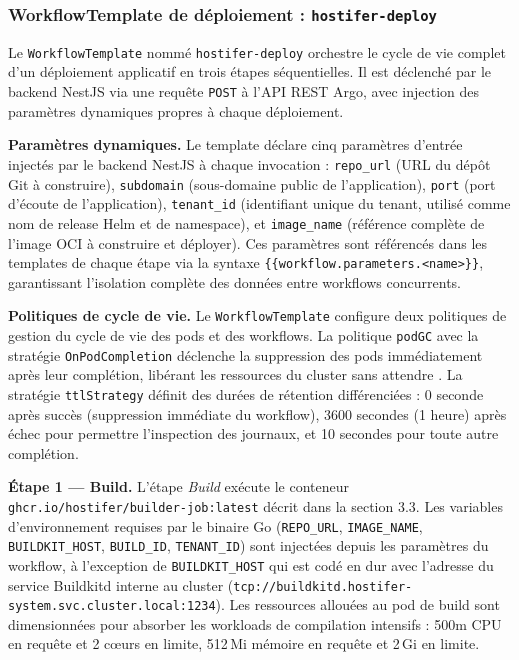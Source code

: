 \subsubsection*{WorkflowTemplate de déploiement : \texttt{hostifer-deploy}}

Le \texttt{WorkflowTemplate} nommé \texttt{hostifer-deploy} orchestre le cycle de vie complet d'un déploiement applicatif en trois étapes séquentielles. Il est déclenché par le backend NestJS via une requête \texttt{POST} à l'API REST Argo, avec injection des paramètres dynamiques propres à chaque déploiement.

\textbf{Paramètres dynamiques.} Le template déclare cinq paramètres d'entrée injectés par le backend NestJS à chaque invocation : \texttt{repo\_url} (URL du dépôt Git à construire), \texttt{subdomain} (sous-domaine public de l'application), \texttt{port} (port d'écoute de l'application), \texttt{tenant\_id} (identifiant unique du tenant, utilisé comme nom de release Helm et de namespace), et \texttt{image\_name} (référence complète de l'image OCI à construire et déployer). Ces paramètres sont référencés dans les templates de chaque étape via la syntaxe \texttt{\{\{workflow.parameters.<name>\}\}}, garantissant l'isolation complète des données entre workflows concurrents.

\textbf{Politiques de cycle de vie.} Le \texttt{WorkflowTemplate} configure deux politiques de gestion du cycle de vie des pods et des workflows. La politique \texttt{podGC} avec la stratégie \texttt{OnPodCompletion} déclenche la suppression des pods immédiatement après leur complétion, libérant les ressources du cluster sans attendre \cite{argo-pod-gc}. La stratégie \texttt{ttlStrategy} définit des durées de rétention différenciées : 0 seconde après succès (suppression immédiate du workflow), 3600 secondes (1 heure) après échec pour permettre l'inspection des journaux, et 10 secondes pour toute autre complétion.

\textbf{Étape 1 — Build.} L'étape \textit{Build} exécute le conteneur \texttt{ghcr.io/hostifer/builder-job:latest} décrit dans la section 3.3. Les variables d'environnement requises par le binaire Go (\texttt{REPO\_URL}, \texttt{IMAGE\_NAME}, \texttt{BUILDKIT\_HOST}, \texttt{BUILD\_ID}, \texttt{TENANT\_ID}) sont injectées depuis les paramètres du workflow, à l'exception de \texttt{BUILDKIT\_HOST} qui est codé en dur avec l'adresse du service Buildkitd interne au cluster (\texttt{tcp://buildkitd.hostifer-system.svc.cluster.local:1234}). Les ressources allouées au pod de build sont dimensionnées pour absorber les workloads de compilation intensifs : 500m CPU en requête et 2 cœurs en limite, 512\,Mi mémoire en requête et 2\,Gi en limite.

